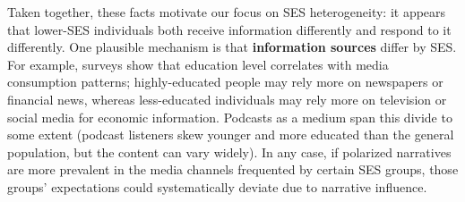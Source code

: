 \documentclass[12pt]{article}
\begin{document}
Taken together, these facts motivate our focus on SES heterogeneity: it appears that lower-SES individuals both receive information differently and respond to it differently. One plausible mechanism is that \textbf{information sources} differ by SES. For example, surveys show that education level correlates with media consumption patterns; highly-educated people may rely more on newspapers or financial news, whereas less-educated individuals may rely more on television or social media for economic information. Podcasts as a medium span this divide to some extent (podcast listeners skew younger and more educated than the general population, but the content can vary widely). In any case, if polarized narratives are more prevalent in the media channels frequented by certain SES groups, those groups' expectations could systematically deviate due to narrative influence.
\end{document}
